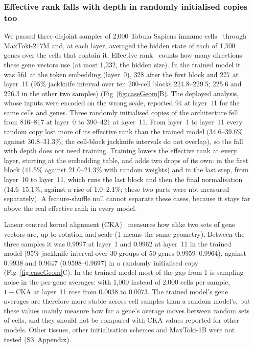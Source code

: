 \subsubsection*{Effective rank falls with depth in randomly initialised copies too}
We passed three disjoint samples of 2,000 Tabula Sapiens immune
cells~\cite{tabulasapiens2022} through MaxToki-217M and, at each layer,
averaged the hidden state of each of 1,500 genes over the cells that
contain it. Effective rank~\cite{roy2007effective} counts how many
directions these gene vectors use (at most 1,232, the hidden size). In the
trained model it was 561 at the token embedding (layer~0), 328 after the
first block and 227 at layer~11 (95\% jackknife interval over ten
200-cell blocks 224.8--229.5; 225.6 and 226.3 in the other two samples)
(Fig~\ref{fig:caseGeom}B). The deployed analysis, whose inputs were
encoded on the wrong scale, reported 94 at layer~11 for the same cells
and genes. Three randomly initialised copies of the architecture fell
from 816--817 at layer~0 to 390--421 at layer~11. From layer~1 to
layer~11 every random copy lost more of its effective rank than the
trained model (34.6--39.6\% against 30.8--31.3\%; the cell-block
jackknife intervals do not overlap), so the fall with depth does not need
training. Training lowers the effective rank at every layer, starting at
the embedding table, and adds two drops of its own: in the first block
(41.5\% against 21.0--21.3\% with random weights) and in the last step,
from layer~10 to layer~11, which runs the last block and then the final
normalisation (14.6--15.1\%, against a rise of 1.0--2.1\%; these two
parts were not measured separately). A feature-shuffle null cannot
separate these cases, because it stays far above the real effective rank
in every model.

Linear centred kernel alignment (CKA)~\cite{kornblith2019cka} measures how alike two sets of gene
vectors are, up to rotation and scale (1 means the same geometry).
Between the three samples it was 0.9997 at layer~1 and 0.9962 at
layer~11 in the trained model (95\% jackknife interval over 30 groups of
50 genes 0.9959--0.9964), against 0.9938 and 0.9647 (0.9598--0.9697) in a
randomly initialised copy (Fig~\ref{fig:caseGeom}C). In the trained model
most of the gap from 1 is sampling noise in the per-gene averages: with
1,000 instead of 2,000 cells per sample, $1-\mathrm{CKA}$ at layer~11
rose from 0.0038 to 0.0073. The trained model's gene averages are
therefore more stable across cell samples than a random model's, but
these values mainly measure how far a gene's average moves between random
sets of cells, and they should not be compared with CKA values reported
for other models. Other tissues, other initialisation schemes and
MaxToki-1B were not tested (S3~Appendix).

